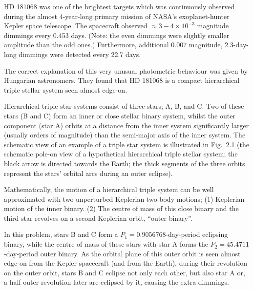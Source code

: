 HD 181068 was one of the brightest targets which was continuously observed
during the almost 4-year-long primary mission of NASA's exoplanet-hunter
Kepler space telescope. The spacecraft observed ${\approx}3-4 \times 10^{-3}$
magnitude dimmings every 0.453 days. (Note: the even dimmings were slightly
smaller amplitude than the odd ones.) Furthermore, additional 0.007
magnitude, 2.3-day-long dimmings were detected every 22.7 days.

The correct explanation of this very unusual photometric behaviour was given
by Hungarian astronomers. They found that HD 181068 is a compact hierarchical
triple stellar system seen almost edge-on.

Hierarchical triple star systems consist of three stars; A, B, and C. Two of
these stars (B and C) form an inner or close stellar binary system, whilst
the outer component (star A) orbits at a distance from the inner system
significantly larger (usually orders of magnitude) than the semi-major axis
of the inner system. The schematic view of an example of a triple star system
is illustrated in Fig.~2.1 (the schematic pole-on view of a hypothetical
hierarchical triple stellar system; the black arrow is directed towards the
Earth; the thick segments of the three orbits represent the stars' orbital
arcs during an outer eclipse).

Mathematically, the motion of a hierarchical triple system can be well
approximated with two unperturbed Keplerian two-body motions; (1) Keplerian
motion of the inner binary. (2) The centre of mass of this close binary and
the third star revolves on a second Keplerian orbit, ``outer binary''.

In this problem, stars B and C form a $P_1 = 0.9056768$-day-period eclipsing
binary, while the centre of mass of these stars with star A forms the
$P_2 = 45.4711$-day-period outer binary. As the orbital plane of this outer
orbit is seen almost edge-on from the Kepler spacecraft (and from the Earth),
during their revolution on the outer orbit, stars B and C eclipse not only
each other, but also star A or, a half outer revolution later are eclipsed by
it, causing the extra dimmings.

